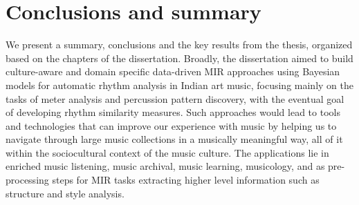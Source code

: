 \section{Conclusions and summary}
We present a summary, conclusions and the key results from the thesis, organized based on the chapters of the dissertation. Broadly, the dissertation aimed to build culture-aware and domain specific data-driven \gls{MIR} approaches using Bayesian models for automatic rhythm analysis in Indian art music, focusing mainly on the tasks of meter analysis and percussion pattern discovery, with the eventual goal of developing rhythm similarity measures. Such approaches would lead to tools and technologies that can improve our experience with music by helping us to navigate through large music collections in a musically meaningful way, all of it within the sociocultural context of the music culture. The applications lie in enriched music listening, music archival, music learning, musicology, and as pre-processing steps for \gls{MIR} tasks extracting higher level information such as structure and style analysis. 

